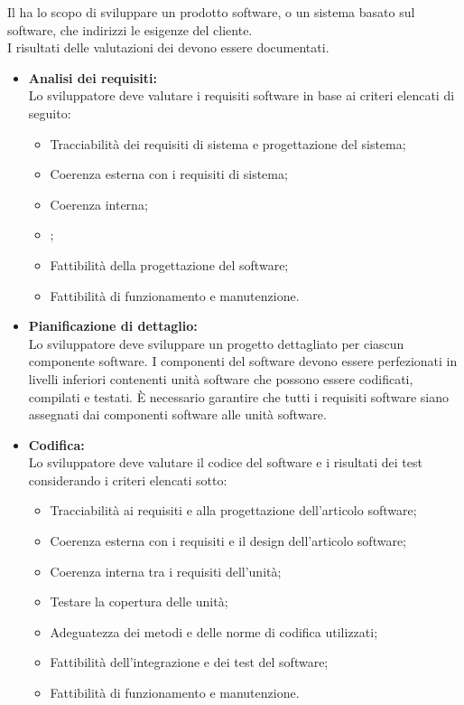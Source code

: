 \hbox{}
Il  ha lo scopo di sviluppare un prodotto software, o un sistema basato sul software, che indirizzi le esigenze del cliente. \\
I risultati delle valutazioni dei  devono essere documentati.
\begin{itemize}
    \item \textbf{Analisi dei requisiti:} \\
    Lo sviluppatore deve valutare i requisiti software in base ai criteri elencati di seguito:
        \begin{itemize}
            \item Tracciabilità dei requisiti di sistema e progettazione del sistema;
            \item Coerenza esterna con i requisiti di sistema;
            \item Coerenza interna;
            \item {};
            \item Fattibilità della progettazione del software;
            \item Fattibilità di funzionamento e manutenzione.
        \end{itemize}
    \item \textbf{Pianificazione di dettaglio:} \\
    Lo sviluppatore deve sviluppare un progetto dettagliato per ciascun componente software. I componenti del software 
    devono essere perfezionati in livelli inferiori contenenti unità software che possono essere codificati, compilati 
    e testati. È necessario garantire che tutti i requisiti software siano assegnati dai componenti software 
    alle unità software.
    
    \item \textbf{Codifica:} \\
    Lo sviluppatore deve valutare il codice del software e i risultati dei test considerando i criteri elencati sotto:
    \begin{itemize}
        \item Tracciabilità ai requisiti e alla progettazione dell'articolo software;
        \item Coerenza esterna con i requisiti e il design dell'articolo software;
        \item Coerenza interna tra i requisiti dell'unità;
        \item Testare la copertura delle unità;
        \item Adeguatezza dei metodi e delle norme di codifica utilizzati;
        \item Fattibilità dell'integrazione e dei test del software;
        \item Fattibilità di funzionamento e manutenzione.   
    \end{itemize}
\end{itemize}

